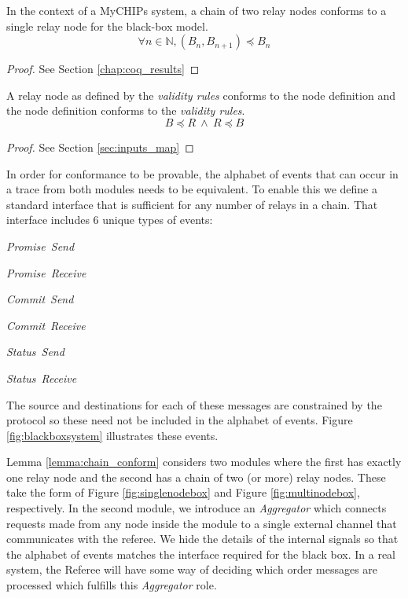 \documentclass[runningheads]{llncs}
\newcommand{\send}{\emph{Send}}
\newcommand{\receive}{\emph{Receive}}
\newcommand{\promise}{\emph{Promise}}
\newcommand{\commit}{\emph{Commit}}
\newcommand{\status}{\emph{Status}}
\newcommand{\figref}[1]{Figure \ref{#1}}
\newcommand{\secref}[1]{Section \ref{#1}}
\begin{document}
\begin{lemma}
\label{lemma:chain_conform}
In the context of a MyCHIPs system, a chain of two relay nodes conforms to a single relay node for the black-box model.
$$\forall n \in \mathds{N}, (B_n, B_{n+1}) \preceq B_n
$$
\begin{proof}
    See \secref{chap:coq_results}
\end{proof}
\end{lemma}

\begin{lemma}
\label{lemma:ind_cof_model}
A relay node as defined by the \emph{validity rules} conforms to the node definition and the node definition conforms to the \emph{validity rules}.
$$B \preceq R\ 
\wedge\ 
R \preceq B$$
\begin{proof}
    See \secref{sec:inputs_map}
\end{proof}
\end{lemma}


In order for conformance to be provable, the alphabet of events that can occur in a trace from both modules needs to be equivalent. To enable this we define a standard interface that is sufficient for any number of relays in a chain. That interface includes 6 unique types of events:
\begin{compactenum}
    \item \promise\ \send\
    \item \promise\ \receive\
    \item \commit\ \send\
    \item \commit\ \receive\
    \item \status\ \send\
    \item \status\ \receive\
\end{compactenum}
\noindent The source and destinations for each of these messages are constrained by the protocol so these need not be included in the alphabet of events. \figref{fig:blackboxsystem} illustrates these events.

Lemma \ref{lemma:chain_conform} considers two modules where the first has exactly one relay node and the second has a chain of two (or more) relay nodes. These take the form of \figref{fig:singlenodebox} and \figref{fig:multinodebox}, respectively. In the second module, we introduce an \emph{Aggregator} which connects requests made from any node inside the module to a single external channel that communicates with the referee. We hide the details of the internal signals so that the alphabet of events matches the interface required for the black box. In a real system, the Referee will have some way of deciding which order messages are processed which fulfills this \emph{Aggregator} role. 
\end{document}
